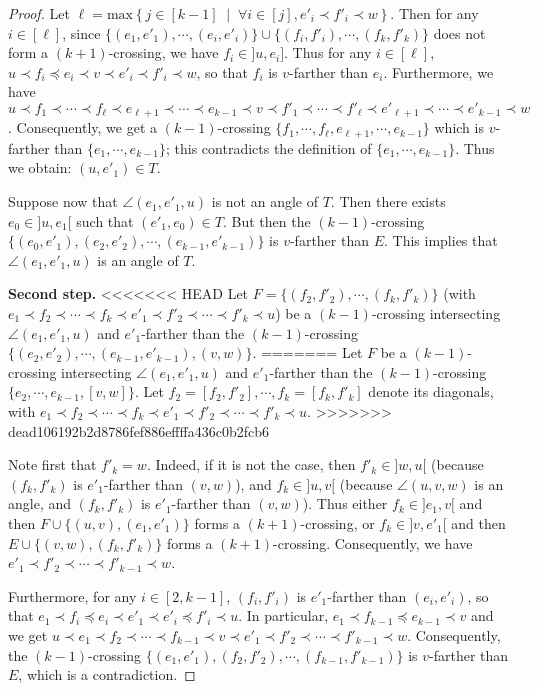 \documentclass{amsart}
\theoremstyle{remark}
\newcommand{\cl}{\prec}
\newcommand{\cle}{\preccurlyeq}
\newcommand{\set}[2]{\left\{ #1 \;\middle|\; #2 \right\}} %
\begin{document}
\begin{proof}
Let $\ell = \text{max}\set{j\in[k-1]}{\forall i\in[j],e'_i \cl f'_i \cl w}$.
Then for any $i\in[\ell]$, since $\{(e_1,e'_1), \cdots , (e_i,e'_i)\} \cup \{(f_i,f'_i), \cdots , (f_k,f'_k)\}$ does not form a $(k + 1)$-crossing, we have $f_i \in ]u, e_i]$. 
Thus for any $i\in[\ell]$, $u \cl f_i \cle e_i \cl v \cl e'_i \cl f'_i \cl w$, so that $f_i$ is $v$-farther than $e_i$.
Furthermore, we have $u \cl f_1 \cl \cdots \cl f_\ell \cl e_{\ell+1} \cl \cdots \cl e_{k-1} \cl v \cl f'_1 \cl \cdots \cl f'_\ell \cl e'_{\ell+1} \cl \cdots \cl e'_{k-1} \cl w$. 
Consequently, we get a $(k - 1)$-crossing $\{f_1, \cdots , f_\ell
, e_{\ell+1}, \cdots , e_{k-1}\}$ which is $v$-farther than $\{e_1, \cdots , e_{k-1}\}$; this contradicts the definition of $\{e_1, \cdots , e_{k-1}\}$. 
Thus we obtain: $(u, e'_1) \in  T$.

Suppose now that $\angle(e_1, e'_1, u)$ is not an angle of $T$. 
Then there exists $e_0 \in ]u, e_1[$ such that $(e'_1, e_0) \in  T$. 
But then the $(k - 1)$-crossing $\{(e_0, e'_1), (e_2,e'_2), \cdots , (e_{k-1},e'_{k-1})\}$ is $v$-farther than $E$. 
This implies that $\angle(e_1, e'_1, u)$ is an angle of $T$.



{\bf Second step.}
<<<<<<< HEAD
Let $F=\{(f_2,f'_2), \cdots , (f_{k},f'_{k})\}$ (with $e_1 \cl f_2 \cl \cdots \cl f_{k} \cl e'_1 \cl f'_2 \cl \cdots \cl f'_{k} \cl u$) be a $(k - 1)$-crossing intersecting $\angle(e_1, e'_1, u)$ and $e'_1$-farther than the $(k-1)$-crossing $\{(e_2,e'_2), \cdots , (e_{k-1},e'_{k-1}), (v, w)\}$.
=======
Let $F$ be a $(k - 1)$-crossing intersecting $\angle(e_1, e'_1, u)$ and $e'_1$-farther than the $(k-1)$-crossing $\{e_2, \cdots , e_{k-1}, [v, w]\}$. 
Let $f_2 = [f_2, f'_2], \cdots , f_k = [f_k, f'_k]$ denote its diagonals, with $e_1 \cl f_2 \cl \cdots \cl f_k \cl e'_1 \cl f'_2 \cl \cdots \cl f'_k \cl u$.
>>>>>>> dead106192b2d8786fef886effffa436c0b2fcb6

Note first that $f'_{k} = w$. 
Indeed, if it is not the case, then $f'_{k} \in ]w, u[$ (because $(f_k,f'_k)$ is $e'_1$-farther than $(v,w)$), and $f_{k} \in ]u,v[$ (because $\angle(u, v, w)$ is an angle, and $(f_k,f'_k)$ is $e'_1$-farther than $(v,w)$).
Thus either $f_k \in ]e_1, v[$ and then $F \cup \{(u, v), (e_1,e'_1)\}$ forms a $(k + 1)$-crossing, or $f_k \in ]v, e'_1[$ and then $E \cup \{(v,w),(f_k, f'_k)\}$ forms a $(k + 1)$-crossing. 
Consequently, we have $e'_1 \cl f'_2 \cl \cdots \cl f'_{k-1} \cl w$.

Furthermore, for any $i\in[2,k-1]$, $(f_i,f'_i)$ is $e'_1$-farther than $(e_i,e'_i)$, so that $e_1 \cl f_i \cle e_i \cl e'_1 \cl e'_i \cle f'_i \cl u$. 
In particular, $e_1 \cl f_{k-1} \cle e_{k-1} \cl v$ and we get $u \cl e_1 \cl f_2 \cl \cdots \cl f_{k-1} \cl v \cl e'_1 \cl f'_2 \cl \cdots \cl f'_{k-1} \cl w$.
Consequently, the $(k - 1)$-crossing $\{(e_1,e'_1), (f_2,f'_2), \cdots , (f_{k-1},f'_{k-1})\}$ is $v$-farther than $E$, which is a contradiction.











\end{proof}
\end{document}
